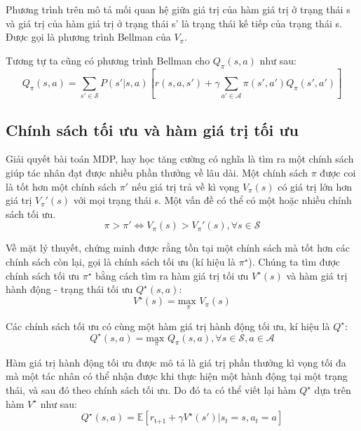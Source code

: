 \documentclass{uetgraduation}
\begin{document}
Phương trình trên mô tả mối quan hệ giữa giá trị của hàm giá trị ở trạng thái s và giá trị của hàm giá trị ở trạng thái s' là trạng thái kế tiếp của trạng thái s. Được gọi là phương trình Bellman
của $V_\pi$.

Tương tự ta cũng có phương trình Bellman cho $Q_\pi(s, a)$ như sau:
\begin{equation}
    Q_\pi(s, a) = \sum_{s' \in \mathcal{S}} P(s' | s, a) [r(s, a, s') + \gamma \sum_{a' \in \mathcal{A}} \pi(s', a') Q_\pi(s', a')]
\end{equation}

\subsection{Chính sách tối ưu và hàm giá trị tối ưu}
Giải quyết bài toán MDP, hay học tăng cường có nghĩa là tìm ra một chính sách giúp tác nhân đạt được nhiều phần thưởng về lâu dài. Một chính sách $\pi$ được coi là tốt hơn một chính sách $\pi'$ nếu giá
trị trả về kì vọng $V_\pi(s)$ có giá trị lớn hơn giá trị $V_\pi'(s)$ với mọi trạng thái s. Một vấn đề có thể có một hoặc nhiều chính sách tối ưu.
\begin{equation}
    \pi > \pi' \iff V_\pi(s) > V_\pi'(s), \forall s \in \mathcal{S}
\end{equation}

Về mặt lý thuyết, chứng minh được rằng tồn tại một chính sách mà tốt hơn các chính sách còn lại, gọi là chính sách tối ưu (kí hiệu là $\pi^\star$). Chúng ta tìm được chính sách tối ưu $\pi^\star$ bằng
cách tìm ra hàm giá trị tối ưu $V^\star(s)$ và hàm giá trị hành động - trạng thái tối ưu $Q^\star (s, a)$:
\begin{equation}
    V^\star (s) = \underset{\pi}{\text{max }} V_\pi(s)
\end{equation}

Các chính sách tối ưu có cùng một hàm giá trị hành động tối ưu, kí hiệu là $Q^\star$:
\begin{equation}
    Q^\star (s, a) = \underset{\pi}{\text{max }} Q_\pi(s, a), \forall s \in \mathcal{S}, a \in \mathcal{A}
\end{equation}

Hàm giá trị hành động tối ưu được mô tả là giá trị phần thưởng kì vọng tối đa mà một tác nhân có thể nhận được khi thực hiện một hành động tại một trạng thái, và sau đó theo chính sách tối ưu. Do đó ta có
thể viết lại hàm $Q^\star$ dựa trên hàm $V^\star$ như sau:
\begin{equation}
    Q^\star (s, a) = \mathbb{E} [r_\text{t+1} + \gamma V^\star (s') | s_t = s, a_t = a]
\end{equation}
\end{document}
